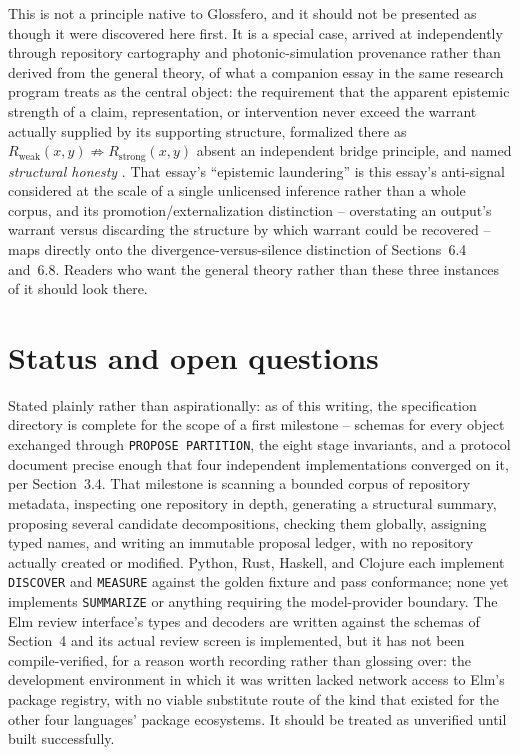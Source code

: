 \documentclass[11pt]{article}
\begin{document}
This is not a principle native to Glossfero, and it should not be presented as though it were discovered here first. It is a special case, arrived at independently through repository cartography and photonic-simulation provenance rather than derived from the general theory, of what a companion essay in the same research program treats as the central object: the requirement that the apparent epistemic strength of a claim, representation, or intervention never exceed the warrant actually supplied by its supporting structure, formalized there as $R_{\mathrm{weak}}(x,y) \not\Rightarrow R_{\mathrm{strong}}(x,y)$ absent an independent bridge principle, and named \emph{structural honesty} \cite{flyxion2026structuralhonesty}. That essay's ``epistemic laundering'' is this essay's anti-signal considered at the scale of a single unlicensed inference rather than a whole corpus, and its promotion/externalization distinction -- overstating an output's warrant versus discarding the structure by which warrant could be recovered -- maps directly onto the divergence-versus-silence distinction of Sections~6.4 and~6.8. Readers who want the general theory rather than these three instances of it should look there.


\section{Status and open questions}

Stated plainly rather than aspirationally: as of this writing, the specification directory is complete for the scope of a first milestone -- schemas for every object exchanged through \texttt{PROPOSE PARTITION}, the eight stage invariants, and a protocol document precise enough that four independent implementations converged on it, per Section~3.4. That milestone is scanning a bounded corpus of repository metadata, inspecting one repository in depth, generating a structural summary, proposing several candidate decompositions, checking them globally, assigning typed names, and writing an immutable proposal ledger, with no repository actually created or modified. Python, Rust, Haskell, and Clojure each implement \texttt{DISCOVER} and \texttt{MEASURE} against the golden fixture and pass conformance; none yet implements \texttt{SUMMARIZE} or anything requiring the model-provider boundary. The Elm review interface's types and decoders are written against the schemas of Section~4 and its actual review screen is implemented, but it has not been compile-verified, for a reason worth recording rather than glossing over: the development environment in which it was written lacked network access to Elm's package registry, with no viable substitute route of the kind that existed for the other four languages' package ecosystems. It should be treated as unverified until built successfully.
\end{document}
